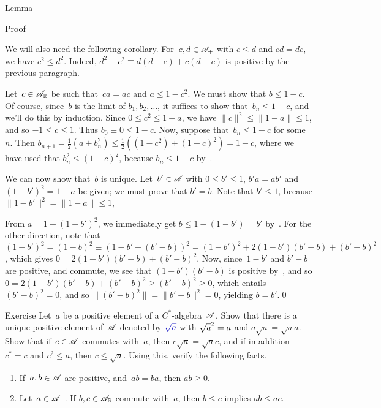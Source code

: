 \documentclass[a]{subfiles}
\begin{document}
\begin{parsec}
\begin{point}{Lemma}
\begin{point}{Proof}
\begin{point}
We will also need the following corollary.
For~$c,d\in\mathscr{A}_{+}$ with $c\leq d$ and $cd=dc$,
we have $c^2\leq d^2$.
Indeed, $d^2-c^2 \equiv d(d-c)+c(d-c)$
is positive by the previous paragraph.
\end{point}
\begin{point}%
Let~$c\in\mathscr{A}_{\mathbb{R}}$ be such that~$ca=ac$ and  $a\leq 1-c^2$.
We must show that $b\leq 1-c$.
Of course,
since~$b$ is the limit of $b_1,b_2,\dotsc$,
it suffices to show that~$b_n\leq 1-c$,
and we'll do this by induction.
Since $0\leq c^2 \leq 1-a$,
 we have $\|c\|^2\leq \|1-a\|\leq 1$,
and so $-1\leq c\leq 1$.
Thus $b_0\equiv 0\leq 1-c$.
Now, suppose that~$b_n\leq 1-c$ for some~$n$.
Then $b_{n+1} = \frac{1}{2}(a+b_n^2)
\leq \frac{1}{2}( (1-c^2)+(1-c)^2) = 1-c$,
where we have used that $b_n^2 \leq (1-c)^2$,
because $b_n\leq 1-c$
by~.
\begin{point}%
We can now show that~$b$ is unique.
Let~$b'\in \mathscr{A}$ with $0\leq b'\leq 1$,
 $b'a=ab'$ and $(1-b')^2=1-a$ be given;
we must prove that $b'=b$.
Note that $b'\leq 1$,
because $\|1-b'\|^2=\|1-a\|\leq 1$,

From $a=1-(1-b')^2$,
we immediately get $b \leq 1-(1-b')=b'$ by~.
For the other direction,
note that
$(1-b')^2= (1-b)^2 \equiv (1-b'+(b'-b))^2 = (1-b')^2+2(1-b')(b'-b)+(b'-b)^2$,
which gives $0=2(1-b')(b'-b)+(b'-b)^2$.
Now, since~$1-b'$ and $b'-b$ are positive,
and commute, we see that $(1-b')(b'-b)$ is positive 
by~, and so 
 $0=2(1-b')(b'-b)+(b'-b)^2\geq (b'-b)^2 \geq 0$,
which entails $(b'-b)^2=0$, and so $\|(b'-b)^2\|=\|b'-b\|^2=0$,
yielding $b=b'$.\qed
\end{point}
\end{point}
\end{point}
\end{point}
\begin{point}[sqrt]{Exercise}%
Let~$a$ be a positive element of a $C^*$-algebra~$\mathscr{A}$.
Show that there is a unique 
positive element of~$\mathscr{A}$
denoted by $\Define{\sqrt{a}}$ with $\smash{\sqrt{a}^2}=a$
and $a\sqrt{a}=\sqrt{a}a$.
Show that if~$c\in\mathscr{A}$ commutes with~$a$,
then $c\sqrt{a}=\sqrt{a}c$,
and if in addition $c^*=c$ and $c^2\leq a$,
then $c\leq \sqrt{a}$.
Using this, verify the following facts.
\begin{enumerate}
\item
If~$a,b\in \mathscr{A}$ are positive,
and~$ab=ba$,
then $ab\geq 0$.

\item
Let~$a\in\mathscr{A}_{+}$.
If $b,c\in \mathscr{A}_{\mathbb{R}}$ commute with~$a$,
then $b\leq c$ implies $ab\leq ac$.


\end{enumerate}
\end{point}
\end{parsec}
\end{document}
